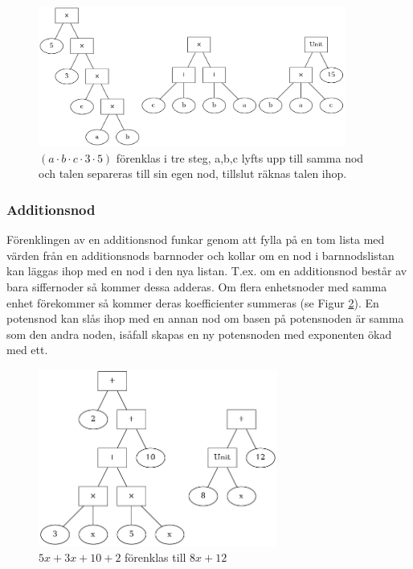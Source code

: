 \documentclass[12pt,a4paper]{article}
\begin{document}
\begin{figure}[h]
  \centering
  \includegraphics[width=0.9\textwidth]{image-merged}
  \caption{\((a \cdot b \cdot c \cdot 3 \cdot 5)\) förenklas i tre steg, a,b,c lyfts upp till samma nod och talen separeras till sin egen nod, tillslut räknas talen ihop.}
  \label{fig:2313}
\end{figure}
\subsubsection{Additionsnod}
Förenklingen av en additionsnod funkar genom att fylla på en tom lista med värden från en additionsnods barnnoder och kollar om en nod i barnnodslistan kan läggas ihop med en nod i den nya listan. T.ex. om en additionsnod består av bara siffernoder så kommer dessa adderas. Om flera enhetsnoder med samma enhet förekommer så kommer deras koefficienter summeras (se Figur \ref{fig:2321}). En potensnod kan slås ihop med en annan nod om basen på potensnoden är samma som den andra noden, isåfall skapas en ny potensnoden med exponenten ökad med ett.
\begin{figure}[h]
  \centering
  \includegraphics[width=0.7\textwidth]{image-merged2}
  \caption{\(5x + 3x + 10 + 2\) förenklas till \(8x + 12\)}
  \label{fig:2321}
\end{figure}
\end{document}
